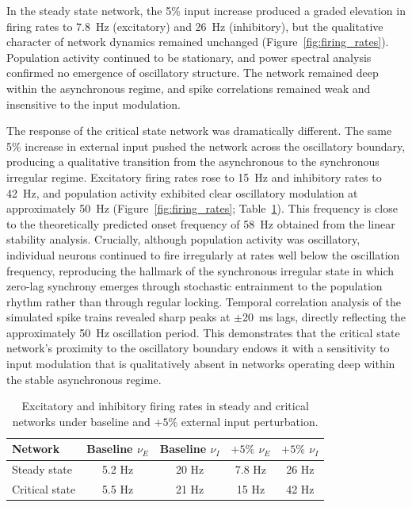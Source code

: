 \documentclass[10pt]{article}
\begin{document}
In the steady state network, the 5\% input increase produced a graded elevation in firing rates to 7.8~Hz (excitatory) and 26~Hz (inhibitory), but the qualitative character of network dynamics remained unchanged (Figure~\ref{fig:firing_rates}). Population activity continued to be stationary, and power spectral analysis confirmed no emergence of oscillatory structure. The network remained deep within the asynchronous regime, and spike correlations remained weak and insensitive to the input modulation.

The response of the critical state network was dramatically different. The same 5\% increase in external input pushed the network across the oscillatory boundary, producing a qualitative transition from the asynchronous to the synchronous irregular regime. Excitatory firing rates rose to 15~Hz and inhibitory rates to 42~Hz, and population activity exhibited clear oscillatory modulation at approximately 50~Hz (Figure~\ref{fig:firing_rates}; Table~\ref{tab:firing_rates}). This frequency is close to the theoretically predicted onset frequency of 58~Hz obtained from the linear stability analysis. Crucially, although population activity was oscillatory, individual neurons continued to fire irregularly at rates well below the oscillation frequency, reproducing the hallmark of the synchronous irregular state in which zero-lag synchrony emerges through stochastic entrainment to the population rhythm rather than through regular locking. Temporal correlation analysis of the simulated spike trains revealed sharp peaks at $\pm$20~ms lags, directly reflecting the approximately 50~Hz oscillation period. This demonstrates that the critical state network's proximity to the oscillatory boundary endows it with a sensitivity to input modulation that is qualitatively absent in networks operating deep within the stable asynchronous regime.

\begin{table}[htbp]
\centering
\caption{Excitatory and inhibitory firing rates in steady and critical networks under baseline and $+5\%$ external input perturbation.}
\label{tab:firing_rates}
\begin{tabular}{lcccc}
\toprule
Network & Baseline $\nu_E$ & Baseline $\nu_I$ & $+5\%$ $\nu_E$ & $+5\%$ $\nu_I$ \\
\midrule
Steady state & 5.2 Hz & 20 Hz & 7.8 Hz & 26 Hz \\
Critical state & 5.5 Hz & 21 Hz & 15 Hz & 42 Hz \\
\bottomrule
\end{tabular}
\end{table}
\end{document}

